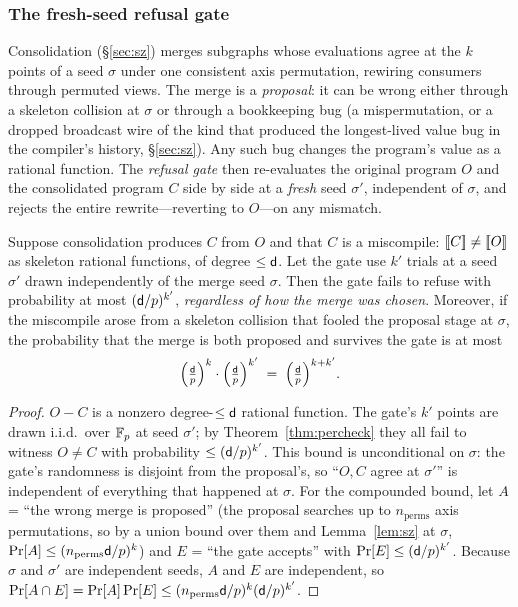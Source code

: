 \documentclass[sigplan,10pt,review]{acmart}
\begin{document}
\subsubsection*{The fresh-seed refusal gate}

Consolidation (\S\ref{sec:sz}) merges subgraphs whose evaluations agree
at the $k$ points of a seed $\sigma$ under one consistent axis
permutation, rewiring consumers through permuted views. The merge is a
\emph{proposal}: it can be wrong either through a skeleton collision at
$\sigma$ or through a bookkeeping bug (a mispermutation, or a dropped
broadcast wire of the kind that produced the longest-lived value bug in
the compiler's history, \S\ref{sec:sz}). Any such bug changes the
program's value as a rational function. The \emph{refusal gate} then
re-evaluates the original program $O$ and the consolidated program $C$
side by side at a \emph{fresh} seed $\sigma'$, independent of $\sigma$,
and rejects the entire rewrite---reverting to $O$---on any mismatch.

\begin{theorem}\label{thm:gate}
Suppose consolidation produces $C$ from $O$ and that $C$ is a miscompile:
$\left[\!\left[C\right]\!\right]\ne\left[\!\left[O\right]\!\right]$ as skeleton rational functions, of degree $\le\mathsf{d}$.
Let the gate use $k'$ trials at a seed $\sigma'$ drawn independently of
the merge seed $\sigma$. Then the gate fails to refuse with probability
at most $(\mathsf{d}/p)^{k'}$, \emph{regardless of how the merge was chosen}.
Moreover, if the miscompile arose from a skeleton collision that fooled
the proposal stage at $\sigma$, the probability that the merge is both
proposed and survives the gate is at most
\[
   \Big(\tfrac{\mathsf{d}}{p}\Big)^{k}\cdot\Big(\tfrac{\mathsf{d}}{p}\Big)^{k'}
   \;=\;\Big(\tfrac{\mathsf{d}}{p}\Big)^{k+k'}.
\]
\end{theorem}

\begin{proof}
$O-C$ is a nonzero degree-$\le\mathsf{d}$ rational function. The gate's $k'$
points are drawn i.i.d.\ over $\mathbb{F}_{p}$ at seed $\sigma'$; by
Theorem~\ref{thm:percheck} they all fail to witness $O\ne C$ with
probability $\le(\mathsf{d}/p)^{k'}$. This bound is unconditional on $\sigma$:
the gate's randomness is disjoint from the proposal's, so ``$O,C$ agree
at $\sigma'$'' is independent of everything that happened at $\sigma$.
For the compounded bound, let $A$ = ``the wrong merge is proposed'' (the proposal searches up to
$n_{\mathrm{perms}}$ axis permutations, so by a union bound over them and
Lemma~\ref{lem:sz} at $\sigma$, $\Pr[A]\le(n_{\mathrm{perms}}\mathsf{d}/p)^{k}$)
and $E$
= ``the gate accepts'' with $\Pr[E]\le(\mathsf{d}/p)^{k'}$. Because $\sigma$ and
$\sigma'$ are independent seeds, $A$ and $E$ are independent, so
$\Pr[A\cap E]=\Pr[A]\Pr[E]\le(n_{\mathrm{perms}}\mathsf{d}/p)^{k}(\mathsf{d}/p)^{k'}$.
\end{proof}
\end{document}
